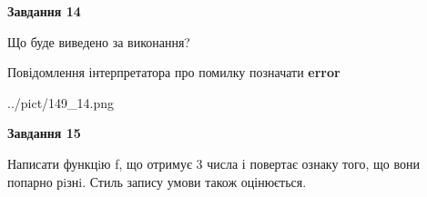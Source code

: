 \documentclass[11pt, ukrainian]{article}
\begin{document}
{\begin {large}
{\begin {center}\textbf{Завдання 14}\end {center}}\par
Що буде виведено за виконання? \par
Повідомлення інтерпретатора про помилку позначати \textbf{error}

\begin{center}
	{../pict/149_14.png}
\end{center}
\newpage

{\begin {center}\textbf{Завдання 15}\end {center}}\par

Написати функцiю f, що отримує 3 числа і повертає ознаку того, що вони попарно рiзнi. Стиль запису умови також оцінюється.\par
\newpage

\end {large}}
\end{document}
